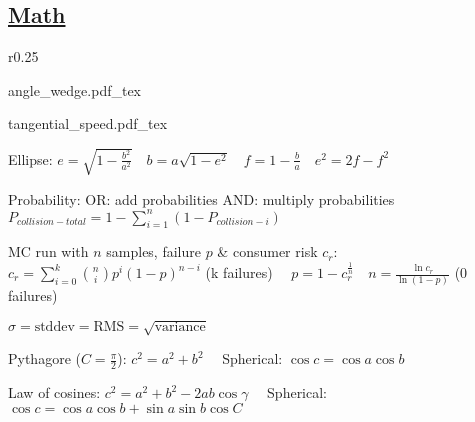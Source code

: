 \documentclass[11pt,landscape]{article}
\begin{document}
\linespread{2}
\raggedright
\footnotesize

\setlength{\premulticols}{1pt}
\setlength{\postmulticols}{1pt}
\setlength{\multicolsep}{1pt}
\setlength{\columnsep}{2pt}



\newcommand{\norm}[1]{\left\lVert #1 \right\rVert}

\makeatletter
\newcommand*\dotp{\mathpalette\dotp@{.5}}
\newcommand*\dotp@[2]{\mathbin{\vcenter{\hbox{\scalebox{#2}{$\m@th#1\bullet$}}}}}
\makeatother


\newpage
\subsection{\underline{Math}}

\begin{wrapfigure}{r}{0.25\textwidth}

\quad

{angle_wedge.pdf_tex}

\quad

{tangential_speed.pdf_tex}
\end{wrapfigure}

Ellipse:
$
e = \sqrt{1-\frac{b^2}{a^2}}
\quad
b = a\sqrt{1-e^2}
\quad
f = 1 - \frac{b}{a}
\quad
e^2 = 2f - f^2
$

Probability: 
OR: add probabilities
AND: multiply probabilities
$P_{collision-total} = 1 - \sum_{i=1}^{n}(1-P_{collision-i})$

MC run with $n$ samples, failure $p$ \& consumer risk $c_r$:
$c_r = \sum_{i=0}^{k} {n \choose i} p^i (1-p)^{n-i}$ (k failures)
$\quad p = 1-c_r^{\frac{1}{n}} \quad n = \frac{\ln c_r}{\ln (1-p)}$ (0 failures)

$
\sigma
= \text{stddev}
= \text{RMS}
= \sqrt{\text{variance}}
$

Pythagore ($C=\frac{\pi}{2}$):
$c^2 = a^2 + b^2
\quad$
Spherical:
$\cos{c} = \cos{a}\cos{b}$

Law of cosines:
$
c^2 = a^2 + b^2 - 2ab\cos{\gamma}
\quad
$
Spherical:
$
\cos{c} = \cos{a}\cos{b} + \sin{a}\sin{b}\cos{C}
$
\end{document}
